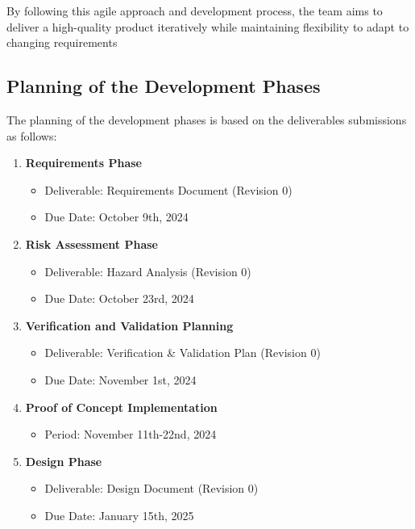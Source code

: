 \documentclass[12pt]{article}
\begin{document}
By following this agile approach and development process, the team aims to deliver a high-quality product iteratively while maintaining flexibility to adapt to changing requirements

\subsection{Planning of the Development Phases}

The planning of the development phases is based on the deliverables submissions as follows:

\begin{enumerate}

    \item \textbf{Requirements Phase}
    \begin{itemize}
        \item Deliverable: Requirements Document (Revision 0)
        \item Due Date: October 9th, 2024
    \end{itemize}
    
    \item \textbf{Risk Assessment Phase}
    \begin{itemize}
        \item Deliverable: Hazard Analysis (Revision 0)
        \item Due Date: October 23rd, 2024
    \end{itemize}
    
    \item \textbf{Verification and Validation Planning}
    \begin{itemize}
        \item Deliverable: Verification \& Validation Plan (Revision 0)
        \item Due Date: November 1st, 2024
    \end{itemize}
    
    \item \textbf{Proof of Concept Implementation}
    \begin{itemize}
        \item Period: November 11th-22nd, 2024
    \end{itemize}
    
    \item \textbf{Design Phase}
    \begin{itemize}
        \item Deliverable: Design Document (Revision 0)
        \item Due Date: January 15th, 2025
    \end{itemize}
    

\end{enumerate}
\end{document}
